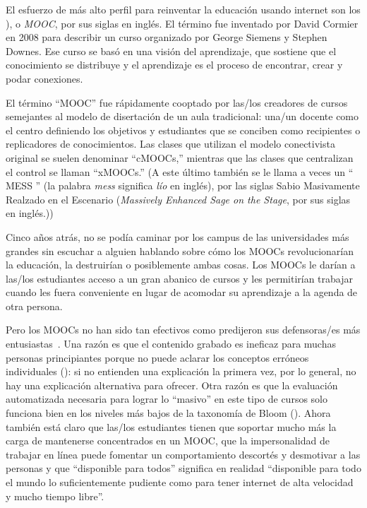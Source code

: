 
El esfuerzo de más alto perfil para reinventar la educación usando internet
son los ), o \emph{MOOC}, por sus siglas en inglés.
El término fue inventado por David Cormier en 2008
para describir un curso organizado por George Siemens
y Stephen Downes.
Ese curso se basó en una visión  del aprendizaje,
que sostiene que el conocimiento se distribuye
y el aprendizaje es el proceso de encontrar, crear y podar conexiones.

El término ``MOOC'' fue rápidamente cooptado por las/los creadores de
cursos semejantes al modelo de disertación de un aula tradicional:
una/un docente como el centro definiendo los objetivos
y estudiantes que se conciben como recipientes o replicadores de conocimientos.
Las clases que utilizan el modelo conectivista original se suelen denominar ``cMOOCs,''
mientras que las clases que centralizan el control se llaman ``xMOOCs.''
(A este último también se le llama a veces un `` MESS '' (la palabra \emph{mess} significa \emph{lío} en inglés),
por las siglas Sabio Masivamente Realzado en el Escenario (\emph{Massively Enhanced Sage on the Stage}, por sus siglas en inglés.))

Cinco años atrás,
no se podía caminar por los campus de las universidades más grandes
sin escuchar a alguien hablando sobre cómo los MOOCs revolucionarían la educación,
la destruirían
o posiblemente ambas cosas.
Los MOOCs le darían a las/los estudiantes acceso a un gran abanico de cursos
y les permitirían trabajar cuando les fuera conveniente
en lugar de acomodar su aprendizaje a la agenda de otra persona.

Pero los MOOCs no han sido tan efectivos
como predijeron sus defensoras/es más entusiastas~\cite{Ubel2017}.
Una razón es que
el contenido grabado es ineficaz para muchas personas principiantes
porque no puede aclarar los conceptos erróneos individuales ():
si no entienden una explicación la primera vez,
por lo general, no hay una explicación alternativa para ofrecer.
Otra razón es que la evaluación automatizada necesaria para lograr lo ``masivo'' en este tipo de cursos
solo funciona bien en los niveles más bajos de la taxonomía de Bloom ().
Ahora también está claro que
las/los estudiantes tienen que soportar mucho más la carga de mantenerse concentrados en un MOOC,
que la impersonalidad de trabajar en línea puede fomentar un comportamiento descortés y desmotivar a las personas
y que ``disponible para todos'' significa en realidad
``disponible para todo el mundo lo suficientemente pudiente como para tener internet de alta velocidad y mucho tiempo libre''.


